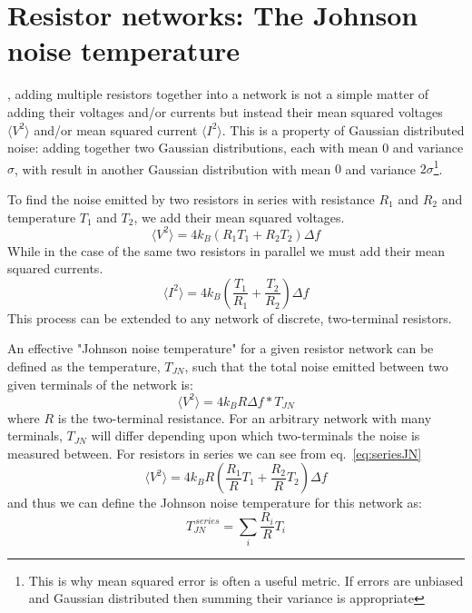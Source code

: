 \section{Resistor networks: The Johnson noise temperature}
\label{section:TJN}
, adding multiple resistors together into a network is not a simple matter of adding their voltages and/or currents but instead their mean squared voltages $\langle V^2\rangle$ and/or mean squared current $\langle I^2\rangle$. This is a property of Gaussian distributed noise: adding together two Gaussian distributions, each with mean $0$ and variance $\sigma$, with result in another Gaussian distribution with mean $0$ and variance $2\sigma$\footnote{This is why mean squared error is often a useful metric. If errors are unbiased and Gaussian distributed then summing their variance is appropriate}.

To find the noise emitted by two resistors in series with resistance $R_1$ and $R_2$ and temperature $T_1$ and $T_2$, we add their mean squared voltages.
\begin{equation} \label{eq:seriesJN}
\langle V^2\rangle = 4k_B (R_1T_1+R_2T_2)\Delta f
\end{equation}
While in the case of the same two resistors in parallel we must add their mean squared currents.
\begin{equation} \label{eq:parallelJN}
\langle I^2\rangle = 4k_B \left(\frac{T_1}{R_1}+\frac{T_2}{R_2}\right)\Delta f
\end{equation}
This process can be extended to any network of discrete, two-terminal resistors.

An effective "Johnson noise temperature" for a given resistor network can be defined as the temperature, $T_{JN}$, such that the total noise emitted between two given terminals of the network is:
\begin{equation}
\langle V^2\rangle = 4k_BR\Delta f * T_{JN}
\end{equation}
where $R$ is the two-terminal resistance. For an arbitrary network with many terminals, $T_{JN}$ will differ depending upon which two-terminals the noise is measured between. For resistors in series we can see from eq.~\ref{eq:seriesJN}
\begin{equation}
\langle V^2\rangle = 4k_BR \left(\frac{R_1}{R}T_1+\frac{R_2}{R}T_2\right)\Delta f
\end{equation}
and thus we can define the Johnson noise temperature for this network as:
\begin{equation}
T_{JN}^{\ series} = \sum_i \frac{R_i}{R}T_i
\end{equation}

